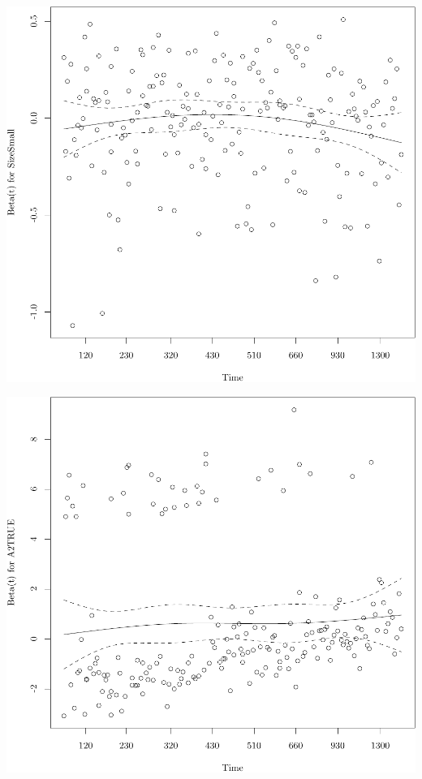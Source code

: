 \documentclass{article}
\begin{document}
\begin{knitrout}
{}




{\centering \includegraphics[width=\maxwidth]{figure/05-eda-ph-check-full-6} 

}




{\centering \includegraphics[width=\maxwidth]{figure/05-eda-ph-check-full-7} 

}
\end{knitrout}
\end{document}
